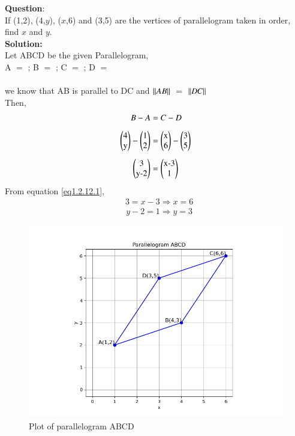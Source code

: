 \documentclass[journal]{IEEEtran}
\begin{document}
\textbf{Question}:\\If (1,2), (4,$y$), ($x$,6) and (3,5) are the vertices of parallelogram taken in order, find $x$ and $y$.
\\ \textbf{Solution: } \\ \hspace{0.5em} Let ABCD be the given Parallelogram, \vspace{0.5em}\\ \hspace*{16em}A $=$ ;  
B $=$ ; C $=$ ; D $=$ \\ \\
we know that AB is parallel to DC and  $\left\vert\left\vert AB\right\vert\right\vert$ $=$ $\left\vert\left\vert DC\right\vert\right\vert$ \\Then,
\begin{align}
B-A&=C-D\\[.5em]
\myvec{4 \\ $y$}-\myvec{1 \\ 2}&=\myvec{$x$ \\ 6}-\myvec{3 \\ 5}\\[0.5em] 
\myvec{3 \\ $y-2$}&=\myvec{$x-3$ \\ 1}\label{eq1.2.12.1} \end{align}
\hspace{8em} From equation\hspace{0.5em} \ref{eq1.2.12.1}, \begin{align} &3=x-3	\Rightarrow x=6  \end{align} \begin{align} &y-2=1 \Rightarrow y=3\end{align}
\begin{figure}[h!]
   \centering
   \includegraphics[width=0.7\linewidth]{Figure_1.png}
   \caption{Plot of parallelogram ABCD}
   \label{Parallelogram}
\end{figure}
\end{document}
